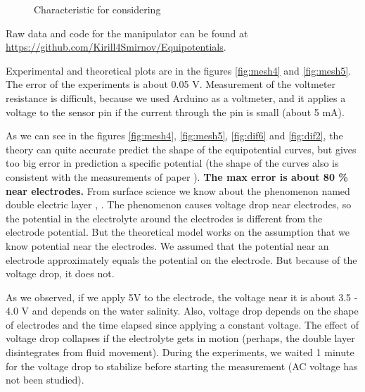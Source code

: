 \documentclass{article}
\begin{document}
\begin{figure}[htb!]
\begin{center}
\end{center}
\caption{Characteristic for considering}
\label{fig:VAC}
\end{figure}

Raw data and code for the manipulator can be found at \url{https://github.com/Kirill4Smirnov/Equipotentials}. \par

Experimental and theoretical plots are in the figures \ref{fig:mesh4} and \ref{fig:mesh5}. The error of the experiments is about 0.05 V. Measurement of the voltmeter resistance is difficult, because we used Arduino as a voltmeter, and it applies a voltage to the sensor pin if the current through the pin is small (about 5 mA). \par


As we can see in the figures \ref{fig:mesh4}, \ref{fig:mesh5}, \ref{fig:dif6} and \ref{fig:dif2}, the theory can quite accurate predict the shape of the equipotential curves, but gives too big error in prediction a specific potential (the shape of the curves also is consistent with the measurements of paper \cite{binder2015high}). \textbf{The max error is about 80 \% near electrodes.} From surface science we know about the phenomenon named double electric layer \cite{kinetika}, \cite{stillinger}. The phenomenon causes voltage drop near electrodes, so the potential in the electrolyte around the electrodes is different from the electrode potential. But the theoretical model works on the assumption that we know potential near the electrodes. We assumed that the potential near an electrode approximately equals the potential on the electrode. But because of the voltage drop, it does not. \par


As we observed, if we apply 5V to the electrode, the voltage near it is about 3.5 - 4.0 V and depends on the water salinity. Also, voltage drop depends on the shape of electrodes and the time elapsed since applying a constant voltage. The effect of voltage drop collapses if the electrolyte gets in motion (perhaps, the double layer disintegrates from fluid movement). During the experiments, we waited 1 minute for the voltage drop to stabilize before starting the measurement (AC voltage has not been studied).\par
\end{document}
